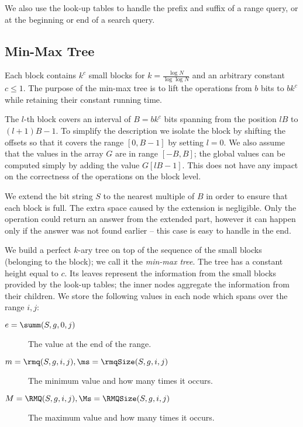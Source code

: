 We also use the look-up tables to handle the prefix and suffix of a range query, or at the beginning or end of a search query.

\subsection{Min-Max Tree}

Each block contains $k^c$ small blocks for $k = \frac{\log N}{\log \log N}$ and an arbitrary constant $c \le 1$.
The purpose of the min-max tree is to lift the operations from $b$ bits to $b k^c$ while retaining their constant running time.

The $l$-th block covers an interval of $B = b k^c$ bits spanning from the position $l B$ to $(l + 1) B - 1$.
To simplify the description we isolate the block by shifting the offsets so that it covers the range $[0, B - 1]$ by setting $l = 0$.
We also assume that the values in the array $G$ are in range $[-B, B]$; the global values can be computed simply by adding the value $G[l B - 1]$.
This does not have any impact on the correctness of the operations on the block level.

We extend the bit string $S$ to the nearest multiple of $B$ in order to ensure that each block is full.
The extra space caused by the extension is negligible.
Only the \fwdSearch{} operation could return an answer from the extended part, however it can happen only if the answer was not found earlier -- this case is easy to handle in the end.

\bigbreak

We build a perfect $k$-ary tree on top of the sequence of the small blocks (belonging to the block); we call it the \emph{min-max tree}.
The tree has a constant height equal to $c$.
Its leaves represent the information from the small blocks provided by the look-up tables; the inner nodes aggregate the information from their children.
We store the following values in each node which spans over the range $i, j$:
\begin{description}
	\item[$e = \summ(S, g, 0, j)$] 
	The value at the end of the range.
	
	\item[$m = \rmq(S, g, i, j), \ms = \rmqSize(S, g, i, j)$]
	The minimum value and how many times it occurs.
	
	\item[$M = \RMQ(S, g, i, j), \Ms = \RMQSize(S, g, i, j)$]
	The maximum value and how many times it occurs.
\end{description}

